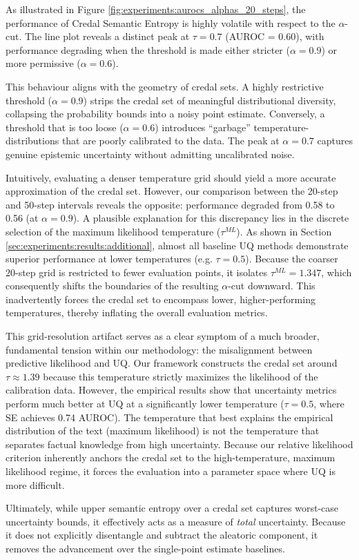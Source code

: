 As illustrated in Figure \ref{fig:experiments:aurocs_alphas_20_steps},
the performance of Credal Semantic Entropy is highly 
volatile with respect to the $\alpha$-cut.
The line plot reveals a distinct peak at $\tau = 0.7$ (AUROC = 0.60),
with performance degrading when the threshold is made either
stricter ($\alpha = 0.9$) or more permissive ($\alpha = 0.6$).

This behaviour aligns with the geometry of credal sets. A highly 
restrictive threshold ($\alpha = 0.9$) strips the credal set of
meaningful distributional diversity, collapsing the probability
bounds into a noisy point estimate. Conversely, a threshold
that is too loose ($\alpha = 0.6$) introduces ``garbage''
temperature-distributions that are poorly calibrated to the data.
The peak at $\alpha = 0.7$ captures genuine epistemic uncertainty 
without admitting uncalibrated noise. 

Intuitively, evaluating a denser temperature grid should yield
a more accurate approximation of the credal set. However,
our comparison between the 20-step and 50-step intervals
reveals the opposite: performance degraded from 0.58 to 0.56
(at $\alpha = 0.9$). A plausible explanation for this discrepancy
lies in the discrete selection of the maximum likelihood 
temperature ($\tau^{ML}$). As shown in Section 
\ref{sec:experiments:results:additional}, almost all baseline 
UQ methods demonstrate superior performance at lower temperatures
(e.g. $\tau=0.5$). Because the coarser 20-step grid is restricted
to fewer evaluation points, it isolates $\tau^{ML}=1.347$,
which consequently shifts the boundaries of the resulting 
$\alpha$-cut downward. This inadvertently forces the credal set
to encompass lower, higher-performing temperatures, thereby
inflating the overall evaluation metrics.

This grid-resolution artifact serves as a clear symptom of a much
broader, fundamental tension within our methodology: the 
misalignment between predictive likelihood and UQ.
Our framework constructs the credal set around $\tau \approx 1.39$
because this temperature strictly maximizes the likelihood
of the calibration data. However, the empirical results show
that uncertainty metrics perform much better at UQ
at a significantly lower temperature 
($\tau = 0.5$, where SE achieves 0.74 AUROC).
The temperature that best explains the 
empirical distribution of the text (maximum likelihood)
is not the temperature that separates factual knowledge
from high uncertainty. Because our relative likelihood
criterion inherently anchors the credal set to the 
high-temperature, maximum likelihood regime, it forces 
the evaluation into a parameter space where UQ 
is more difficult.

Ultimately, while upper semantic entropy over a credal
set captures worst-case uncertainty bounds,
it effectively acts as a measure of \textit{total}
uncertainty. Because it does not explicitly disentangle 
and subtract the aleatoric component, it removes the
advancement over the single-point estimate baselines.
